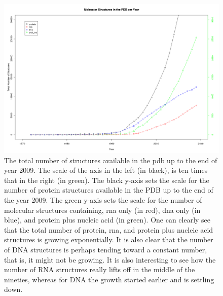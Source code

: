 \begin{figure}
\centering
\includegraphics[angle=90, scale=0.5]{Supplement/allmolecules_per_year.png}
\caption{The total number of structures available in the pdb up to the
end of year 2009. The scale of the axis in the left (in black), is ten
times that in the right (in green). The black y-axis sets the scale
for the number of protein structures available in the PDB up to the
end of the year 2009. The green y-axis sets the scale for the number
of molecular structures containing, rna only (in red), dna only (in
blue), and protein plus nucleic acid (in green).
One can clearly see that the total number of protein, rna, and protein
plus nucleic acid structures is growing exponentially. It is also
clear that the number of DNA structures is perhaps tending toward a
constant number, that is, it might not be growing. It is also
interesting to see how the number of RNA structures really lifts off in the
middle of the nineties, whereas for DNA the growth started earlier and
is settling down.}
\label{fig:allpolypdb}
\end{figure}




